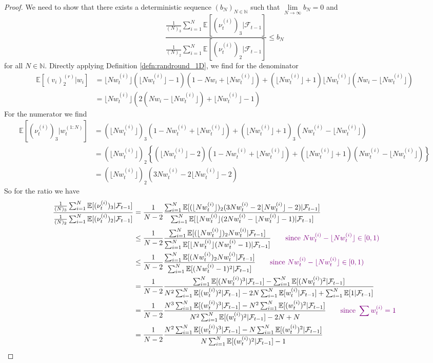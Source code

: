 \documentclass[fleqn]{article}
\theoremstyle{definition}
\newcommand{\N}{\mathbb{N}}
\newcommand{\E}{\mathbb{E}}
\newcommand{\limNtoinfty}{\underset{N\to\infty}{\lim}}
\newcommand{\F}{\mathcal{F}_{t-1}}
\newcommand{\vt}[2][t]{\nu_{#1}^{(#2)}}
\newcommand{\wt}[2][t]{w_{#1}^{(#2)}}
\newcommand{\flnw}{\lfloor N\wt{i} \rfloor }
\begin{document}
\begin{proof}
We need to show that there exists a deterministic sequence $(b_N)_{N\in\N}$ such that $\limNtoinfty b_N =0$ and
\begin{equation}\label{eq:mn_ratiobound}
\frac{\frac{1}{(N)_3}\sum_{i=1}^N \E[(\vt{i})_3 |\F]}{\frac{1}{(N)_2} \sum_{i=1}^N \E[(\vt{i})_2 |\F]} \leq b_N
\end{equation}
for all $N \in \N$. 
Directly applying Definition \ref{defn:randround_1D}, we find for the denominator
\begin{align*}
\E[(v_i)_2^{(r)} | w_i] &= \flnw (\flnw -1) (1 - Nw_i + \flnw) + (\flnw +1) \flnw (Nw_i - \flnw) \\
&= \flnw \left( 2(Nw_i - \flnw) + \flnw -1 \right)
\end{align*}
For the numerator we find
\begin{align*}
\E[(\vt{i})_3 |\wt{1:N}] 
&= (\flnw)_3(1-N\wt{i} + \flnw) + (\flnw +1)_3(N\wt{i} - \flnw) \\
&= (\flnw)_2 \left\{ (\flnw -2)(1-N\wt{i} + \flnw) + (\flnw +1)(N\wt{i} - \flnw)\right\} \\
&= (\flnw)_2 \left( 3N\wt{i} - 2\flnw -2 \right)
\end{align*}
So for the ratio we have
\begin{align*}
\frac{\frac{1}{(N)_3}\sum_{i=1}^N \E[(\vt{i})_3 |\F]}{\frac{1}{(N)_2} \sum_{i=1}^N \E[(\vt{i})_2 |\F]}  
&= \frac{1}{N-2} \frac{\sum_{i=1}^N \E[(\flnw)_2(3N\wt{i} - 2\flnw -2) |\F]}{ \sum_{i=1}^N \E[\flnw(2N\wt{i} - \flnw -1) |\F]} \\
&\leq \frac{1}{N-2} \frac{\sum_{i=1}^N \E[(\flnw)_2N\wt{i} |\F]}{ \sum_{i=1}^N \E[\flnw(N\wt{i} -1) |\F]} \qquad \textcolor{violet}{\text{since }N\wt{i} - \flnw \in [0,1)}\\
&\leq \frac{1}{N-2} \frac{\sum_{i=1}^N \E[(N\wt{i})_2 N\wt{i} |\F]}{ \sum_{i=1}^N \E[(N\wt{i} -1)^2 |\F]} \qquad \textcolor{violet}{\text{since }N\wt{i} - \flnw \in [0,1)}\\
&= \frac{1}{N-2} \frac{\sum_{i=1}^N \E[(N\wt{i})^3 |\F] - \sum_{i=1}^N \E[(N\wt{i})^2 |\F]}{ N^2 \sum_{i=1}^N \E[(\wt{i})^2 |\F] - 2N \sum_{i=1}^N \E[\wt{i} |\F] + \sum_{i=1}^N \E[1 |\F]} \\
&= \frac{1}{N-2} \frac{N^3 \sum_{i=1}^N \E[(\wt{i})^3 |\F] - N^2 \sum_{i=1}^N \E[(\wt{i})^2 |\F]}{ N^2 \sum_{i=1}^N \E[(\wt{i})^2 |\F] - 2N  + N} \qquad \textcolor{violet}{\text{since }\sum \wt{i} =1}\\
&= \frac{1}{N-2} \frac{N^2 \sum_{i=1}^N \E[(\wt{i})^3 |\F] - N \sum_{i=1}^N \E[(\wt{i})^2 |\F]}{ N \sum_{i=1}^N \E[(\wt{i})^2 |\F] - 1} \\

\end{align*}
\end{proof}
\end{document}
